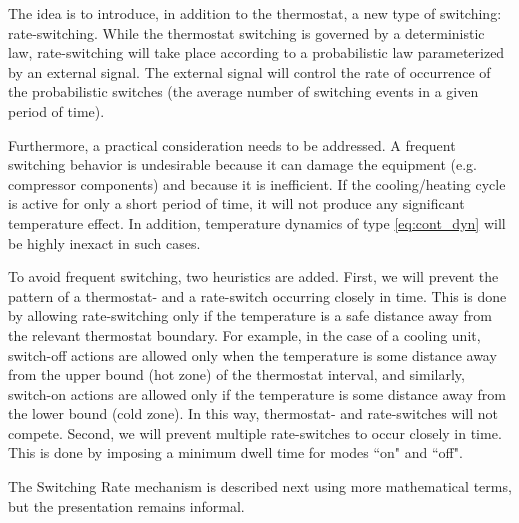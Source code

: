\documentclass[submission,copyright,creativecommons]{eptcs}
\begin{document}
The idea is to introduce, in addition to the thermostat, a new type of switching: rate-switching. While the thermostat switching is governed by a deterministic law, rate-switching will take place according to a probabilistic law parameterized by an external signal. The external signal will control the rate of occurrence of the probabilistic switches (the average number of switching events in a given period of time). 


Furthermore, a practical consideration needs to be addressed. A frequent switching behavior is undesirable because it can damage the equipment (e.g. compressor components) and because it is inefficient. If the cooling/heating cycle is active for only a short period of time, it will not produce any significant temperature effect. In addition, temperature dynamics of type \eqref{eq:cont_dyn} will be highly inexact in such cases. 

To avoid frequent switching, two heuristics are added. First, we will prevent the pattern of a thermostat- and a rate-switch occurring closely in time. This is done by allowing rate-switching only if the temperature is a safe distance away from the relevant thermostat boundary. For example, in the case of a cooling unit, switch-off actions are allowed only when the temperature is some distance away from the upper bound (hot zone) of the thermostat interval, and similarly, switch-on actions are allowed only if the temperature is some distance away from the lower bound (cold zone). In this way,  thermostat- and rate-switches will not compete. Second, we will prevent multiple rate-switches to occur closely in time. This is done by imposing a minimum dwell time for modes ``on" and ``off".

The Switching Rate mechanism is described next using more mathematical terms, but the presentation remains informal.  
\end{document}
